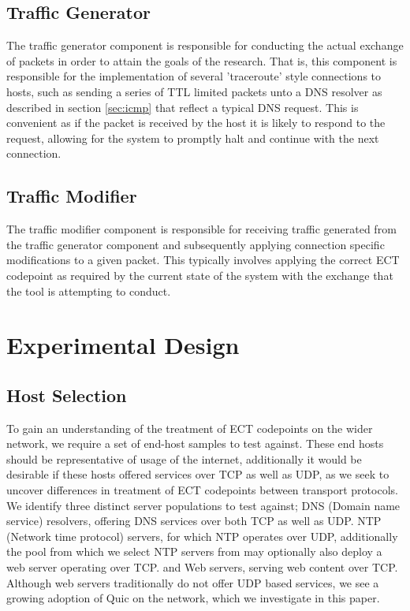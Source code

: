 \documentclass{l4proj}
\begin{document}
\subsection{Traffic Generator}

The traffic generator component is responsible for conducting the actual exchange of packets in order to attain the goals of the research. That is, this component is responsible for the implementation of several 'traceroute' style connections to hosts, such as sending a series of TTL limited packets unto a DNS resolver as described in section \ref{sec:icmp} that reflect a typical DNS request. This is convenient as if the packet is received by the host it is likely to respond to the request, allowing for the system to promptly halt and continue with the next connection.

\subsection{Traffic Modifier}

The traffic modifier component is responsible for receiving traffic generated from the traffic generator component and subsequently applying connection specific modifications to a given packet. This typically involves applying the correct ECT codepoint as required by the current state of the system with the exchange that the tool is attempting to conduct.

\section{Experimental Design}

\subsection{Host Selection}

To gain an understanding of the treatment of ECT codepoints on the wider network, we require a set of end-host samples to test against. These end hosts should be representative of usage of the internet, additionally it would be desirable if these hosts offered services over TCP as well as UDP, as we seek to uncover differences in treatment of ECT codepoints between transport protocols. We identify three distinct server populations to test against; DNS (Domain name service) resolvers, offering DNS services over both TCP as well as UDP. NTP (Network time protocol) servers, for which NTP operates over UDP, additionally the pool from which we select NTP servers from may optionally also deploy a web server operating over TCP. and Web servers, serving web content over TCP. Although web servers traditionally do not offer UDP based services, we see a growing adoption of Quic on the network, which we investigate in this paper.
\end{document}
